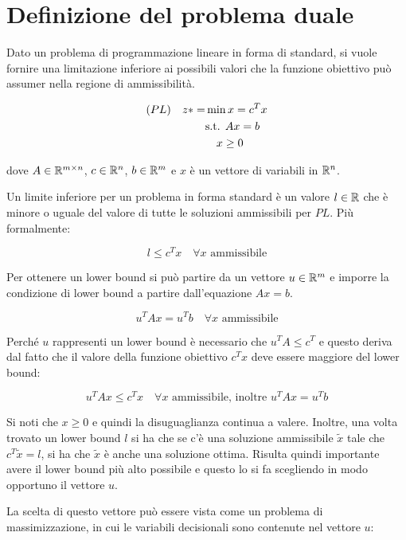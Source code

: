 
\section{Definizione del problema duale}

Dato un problema di programmazione lineare in forma di standard, si vuole fornire una limitazione inferiore ai possibili valori che la funzione obiettivo può assumer nella regione di ammissibilità.

\begin{align*}
	(PL) \quad z* = &\min x = c^T x \\
	                &\text{s.t. } Ax = b \\
	                &\quad x \geq 0
\end{align*}

dove $A \in \mathbb{R}^{m \times n}$, $c \in \mathbb{R}^n$, $b \in \mathbb{R}^m$ e $x$ è un vettore di variabili in $\mathbb{R}^n$.

Un limite inferiore per un problema in forma standard è un valore $l \in \mathbb{R}$ che è minore o uguale del valore di tutte le soluzioni ammissibili per $PL$.
Più formalmente:

$$
l \leq c^T x \quad \forall x \text{ ammissibile}
$$

Per ottenere un lower bound  si può partire da un vettore $u \in \mathbb{R}^m$ e imporre la condizione di lower bound a partire dall'equazione $Ax = b$.

$$
u^TAx= u^Tb \quad\forall x \text{ ammissibile}
$$

Perché $u$ rappresenti un lower bound è necessario che $u^TA \leq c^T $ e questo deriva dal fatto che il valore della funzione obiettivo $c^Tx$ deve essere maggiore del lower bound:

$$
u^T A x \leq c^T x\quad\forall x \text{ ammissibile, inoltre } u^T A x = u^T b 
$$

Si noti che $x\geq0$ e quindi la disuguaglianza continua a valere.
Inoltre, una volta trovato un lower bound $l$ si ha che se c'è una soluzione ammissibile $\tilde{x}$ tale che $c^T\tilde{x} = l$, si ha che $\tilde{x}$ è anche una soluzione ottima.
Risulta quindi importante avere il lower bound più alto possibile e questo lo si fa scegliendo in modo opportuno il vettore $u$.

La scelta di questo vettore può essere vista come un problema di massimizzazione, in cui le variabili decisionali sono contenute nel vettore $u$:

